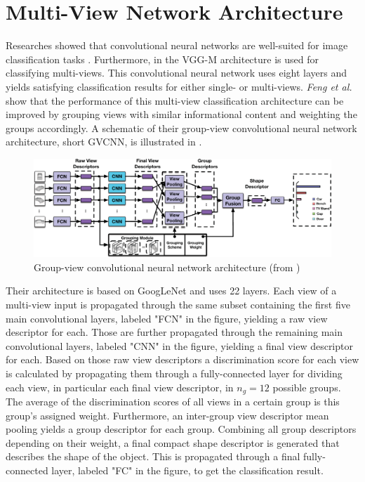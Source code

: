 \section{Multi-View Network Architecture}
\label{sec:methods-architecture}
Researches showed that convolutional neural networks are well-suited for image classification tasks \cite{Simonyan15, He2016ResNet, SzegedyInceptionv4}.
Furthermore, in \cite{Su:2015:MCN:2919332.2919750} the VGG-M \cite{journals/corr/ChatfieldSVZ14} architecture is used for classifying multi-views.
This convolutional neural network uses eight layers and yields satisfying classification results for either single- or multi-views.
\textit{Feng et al.} \cite{Feng2018} show that the performance of this multi-view classification architecture can be improved by grouping views with similar informational content and weighting the groups accordingly.
A schematic of their group-view convolutional neural network architecture, short GVCNN, is illustrated in .
\begin{figure}
	\centering
	\includegraphics[width=\textwidth]{images/gvcnn_framework.png}
	\caption{Group-view convolutional neural network architecture (from \cite{Feng2018})}
	\label{fig:gvcnn-framework}
\end{figure}
Their architecture is based on GoogLeNet \cite{szegedy2015} and uses 22 layers.
Each view of a multi-view input is propagated through the same subset containing the first five main convolutional layers, labeled "FCN" in the figure, yielding a raw view descriptor for each.
Those are further propagated through the remaining main convolutional layers, labeled "CNN" in the figure, yielding a final view descriptor for each.
Based on those raw view descriptors a discrimination score for each view is calculated by propagating them through a fully-connected layer for dividing each view, in particular each final view descriptor, in $n_g = 12$ possible groups.
The average of the discrimination scores of all views in a certain group is this group's assigned weight.
Furthermore, an inter-group view descriptor mean pooling yields a group descriptor for each group.
Combining all group descriptors depending on their weight, a final compact shape descriptor is generated that describes the shape of the object.
This is propagated through a final fully-connected layer, labeled "FC" in the figure, to get the classification result.

